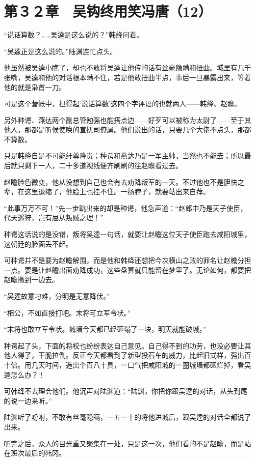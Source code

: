 \section{第３２章　吴钩终用笑冯唐（12）}

“说话算数？……吴逵是这么说的？”韩绛问着。

“吴逵正是这么说的。”陆渊连忙点头。

他虽然被吴逵小瞧了，却也不敢将吴逵让他传的话有丝毫隐瞒和扭曲。城里有几千张嘴，吴逵和他的对话根本瞒不住，若是他敢扭曲半点，事后一旦暴露出来，等着他的就是枭首一刀。

可是这个营帐中，担得起‘说话算数’这四个字评语的也就两人——韩绛、赵瞻。

另外种谔、燕达两个副总管勉强也能搭点边——好歹可以被称为太尉了——至于其他人，那都是听候使唤的宣抚司僚属。他们说出的话，只要几个大佬不点头，那都不算数。

只是韩绛自是不可能纡尊降贵；种谔和燕达乃是一军主帅，当然也不能去；所以最后就只剩下一人，二十多道视线便齐刷刷的往赵瞻看过去。

赵瞻脸色微变，他从没想到自己也会有去劝降叛军的一天。不过他也不是胆怯之辈，在这里退缩了，他脸上也挂不住。一扬脖子，就要站出来自荐。

“此事万万不可！”先一步跳出来的却是种谔，他急声道：“赵郎中乃是天子使臣，代天巡狩，岂有屈从叛贼之理！”

种谔这话说的是没错，叛将吴逵一句话，就要让赵瞻这位天子使臣跑去咸阳城里，这朝廷的脸面丢不起。

可种谔并不是要为赵瞻解围，而是他和韩绛还想把今次横山之败的罪名让赵瞻分担一点。要是让赵瞻出面劝降成功，这些盘算就只能留在梦里了。无论如何，都要把赵瞻撇到一边去。

“吴逵故意刁难，分明是无意降伏。”

“相公，不如直接打吧。末将可立军令状。”

“末将也敢立军令状。城墙今天都已经砸塌了一块，明天就能破城。”

种谔起了头，下面的将校也纷纷表达自己意见。自己得不到的功劳，也没必要让其他人得了，干脆拉倒。反正今天都看到了新型投石车的威力，比起旧式样，强出百十倍。用几天时间，造出个百八十具，一口气把咸阳城的一圈城墙都砸烂掉，看吴逵怎么办？！

可韩绛不去理会他们。他沉声对陆渊道：“陆渊，你把你跟吴逵的对话，从头到尾的说一边来听。”

陆渊听了吩咐，不敢有丝毫隐瞒，一五一十的将他进城后，跟吴逵的对话全都说了出来。

听完之后，众人的目光重又聚集在一处，只是这一次，他们看的不是赵瞻，而是站在班次最后的韩冈。


